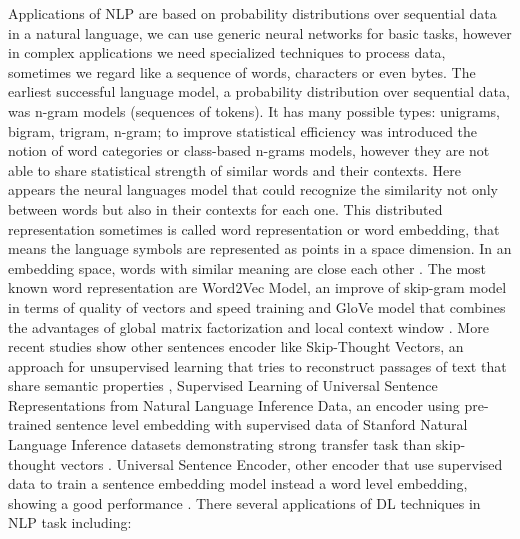 \documentclass[12pt]{report}
\begin{document}
Applications of \ac{NLP} are based on probability distributions over sequential data in a natural language, we can use generic neural networks for basic tasks, however in complex applications we need specialized techniques to process data, sometimes we regard like a sequence of words, characters or even bytes. The earliest successful language model, a probability distribution over sequential data, was n-gram models (sequences of tokens). It has many possible types: unigrams, bigram, trigram, n-gram; to improve statistical efficiency was introduced the notion of word categories or class-based n-grams models, however they are not able to share statistical strength of similar words and their contexts. Here appears the neural languages model that could recognize the similarity not only between words but also in their contexts for each one. This distributed representation sometimes is called word representation or word embedding, that means the language symbols are represented as points in a space dimension. In an embedding space, words with similar meaning are close each other \cite{Russell2010} \cite{Goodfellow2016}. The most known word representation are Word2Vec Model, an improve of skip-gram model in terms of quality of vectors and speed training \cite{Mikolov2013} and GloVe model that combines the advantages of global matrix factorization and local context window \cite{Pennington2014}. More recent studies show other sentences encoder like Skip-Thought Vectors, an approach for unsupervised learning that tries to reconstruct passages of text that share semantic properties \cite{Kiros2015}, Supervised Learning of Universal Sentence Representations from Natural Language Inference Data, an encoder using pre-trained sentence level embedding with supervised data of Stanford Natural Language Inference datasets demonstrating strong transfer task than skip-thought vectors \cite{ Conneau2017}. Universal Sentence Encoder, other encoder that use supervised data to train a sentence embedding model instead a word level embedding, showing a good performance \cite{ Cer2018}. There several applications of \ac{DL} techniques in \ac{NLP} task including:
\end{document}
